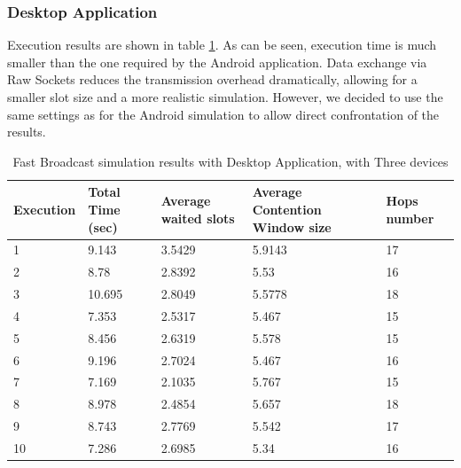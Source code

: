\subsubsection{Desktop Application}

Execution results are shown in table \ref{tab:Desktop_res}. As can be seen, execution time is much smaller than the one required by the Android application. Data exchange via Raw Sockets reduces the transmission overhead dramatically, allowing for a smaller slot size and a more realistic simulation. However, we decided to use the same settings as for the Android simulation to allow direct confrontation of the results.

\begin{table}
\caption{Fast Broadcast simulation results with Desktop Application, with Three devices}
\label{tab:Desktop_res}
\centering
\begin{tabular}{|m{}|m{}|m{}|m{}|m{}|}
\hline
Execution & Total \newline Time (sec) & Average waited slots & Average Contention Window size & Hops \newline number \\
\hline
1 & 9.143	& 3.5429	& 5.9143 	& 17 \\
\hline
2 & 8.78	& 2.8392  	& 5.53 		& 16 \\
\hline
3 & 10.695 	& 2.8049	& 5.5778 	& 18 \\
\hline
4 & 7.353 	& 2.5317  	& 5.467 	& 15 \\ 
\hline
5 & 8.456	& 2.6319 	& 5.578		& 15 \\
\hline
6 & 9.196	& 2.7024 	& 5.467		& 16 \\ 
\hline
7 & 7.169	& 2.1035	& 5.767		& 15 \\
\hline
8 & 8.978	& 2.4854	& 5.657		& 18 \\
\hline
9 & 8.743	& 2.7769	& 5.542		& 17 \\
\hline
10 & 7.286	& 2.6985 	& 5.34 		& 16 \\
\hline
\end{tabular}
\end{table}  
